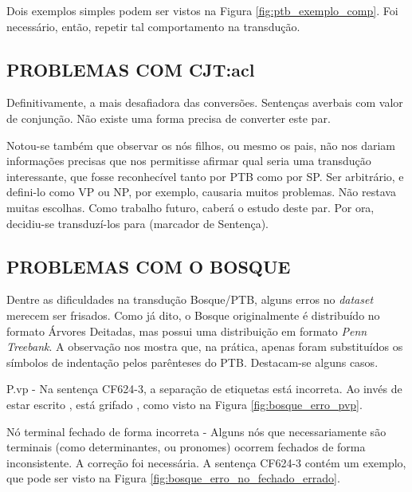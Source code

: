 Dois exemplos simples podem ser vistos na Figura \ref{fig:ptb_exemplo_comp}. Foi necessário, então, repetir tal comportamento na transdução.
\begin{center}
    
\end{center}
\subsection{PROBLEMAS COM CJT:acl}
\label{subsec:CJT_acl}
Definitivamente, a mais desafiadora das conversões. Sentenças averbais com valor de conjunção. Não existe uma forma precisa de converter este par. 

Notou-se também que observar os nós filhos, ou mesmo os pais, não nos dariam informações precisas que nos permitisse afirmar qual seria uma transdução interessante, que fosse reconhecível tanto por PTB como por SP. Ser arbitrário, e defini-lo como VP ou NP, por exemplo, causaria muitos problemas. Não restava muitas escolhas. Como trabalho futuro, caberá o estudo deste par. Por ora, decidiu-se transduzí-los para  (marcador de Sentença).
\subsection{PROBLEMAS COM O BOSQUE}
\label{subsec:erros_bosque}
Dentre as dificuldades na transdução Bosque/PTB, alguns erros no \textit{dataset} merecem ser frisados. Como já dito, o Bosque originalmente é distribuído no formato Árvores Deitadas, mas possui uma distribuição em formato \textit{Penn Treebank}. A observação nos mostra que, na prática, apenas foram substituídos os símbolos de indentação pelos parênteses do PTB. 
Destacam-se alguns casos.

P.vp - Na sentença CF624-3, a separação de etiquetas está incorreta. Ao invés de estar escrito , está grifado , como visto na Figura \ref{fig:bosque_erro_pvp}.

\begin{center}
    
\end{center}

Nó terminal fechado de forma incorreta - Alguns nós que necessariamente são terminais (como determinantes, ou pronomes) ocorrem fechados de forma inconsistente. A correção foi necessária. A sentença CF624-3 contém um exemplo, que pode ser visto na Figura \ref{fig:bosque_erro_no_fechado_errado}.

